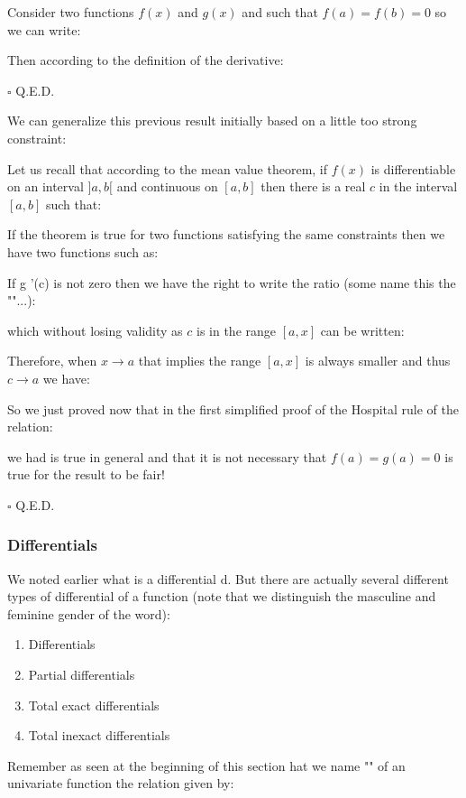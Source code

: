 	\begin{dem}
		Consider two functions $f(x)$ and $g(x)$ and such that $f(a)=f(b)=0$ so we can write:
		
		Then according to the definition of the derivative:
		
		\begin{flushright}
			$\square$  Q.E.D.
		\end{flushright}		
	\end{dem}
We can generalize this previous result initially based on a little too strong constraint:
	
	\begin{dem}
Let us recall that according to the mean value theorem, if $f(x)$ is differentiable on an interval $]a, b[$ and continuous on $[a, b]$ then there is a real $c$ in the interval $[a, b]$ such that:
		
		If the theorem is true for two functions satisfying the same constraints then we have two functions such as:
		
				If g '(c) is not zero then we have the right to write the ratio (some name this the "\index{generalized mean value theorem}"...):	
		
		which without losing validity as $c$ is in the range $[a, x]$ can be written:
		
		Therefore, when $x \rightarrow a$ that implies the range $[a, x]$ is always smaller and thus $c \rightarrow a$ we have:
		
		So we just proved now that in the first simplified proof of the Hospital rule of the relation:
		
		we had is true in general and that it is not necessary that $f(a)=g(a)=0$ is true for the result to be fair!
		\begin{flushright}
			$\square$  Q.E.D.
		\end{flushright}
	\end{dem}
	
	\pagebreak
	\subsubsection{Differentials}
	
	We noted earlier what is a differential $\mathrm{d}$. But there are actually several different types of differential of a function (note that we distinguish the masculine and feminine gender of the word):
	\begin{enumerate}
		\item Differentials
		\item Partial differentials
		\item Total exact differentials
		\item Total inexact differentials
	\end{enumerate}
		Remember as seen at the beginning of this section hat we name  "\label{differential}" of an univariate function the relation given by:
	
